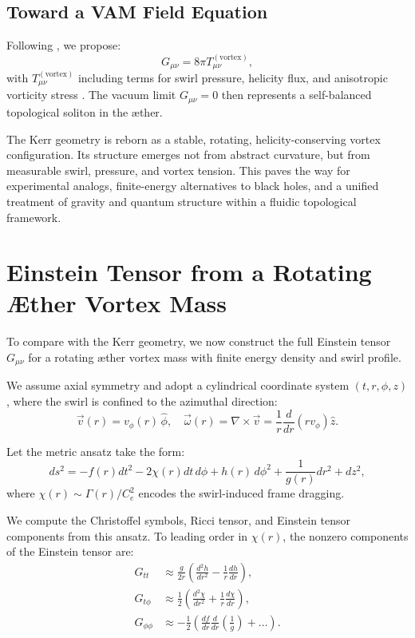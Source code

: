 \documentclass[twocolumn,aps,pre,floatfix,nofootinbib]{revtex4-2}
\begin{document}
\subsection{Toward a VAM Field Equation}
    Following \cite{Iskandarani2025c}, we propose:
    \begin{equation}
    G_{\mu\nu} = 8\pi T_{\mu\nu}^{(\text{vortex})},
    \end{equation}
    with $T_{\mu\nu}^{(\text{vortex})}$ including terms for swirl pressure, helicity flux, and anisotropic vorticity stress \cite{Iskandarani2025e}. The vacuum limit $G_{\mu\nu} = 0$ then represents a self-balanced topological soliton in the æther.

    The Kerr geometry is reborn as a stable, rotating, helicity-conserving vortex configuration. Its structure emerges not from abstract curvature, but from measurable swirl, pressure, and vortex tension. This paves the way for experimental analogs, finite-energy alternatives to black holes, and a unified treatment of gravity and quantum structure within a fluidic topological framework.





\section{Einstein Tensor from a Rotating Æther Vortex Mass}

    To compare with the Kerr geometry, we now construct the full Einstein tensor \( G_{\mu\nu} \) for a rotating æther vortex mass with finite energy density and swirl profile.

    We assume axial symmetry and adopt a cylindrical coordinate system \( (t, r, \phi, z) \), where the swirl is confined to the azimuthal direction:
    \[
        \vec{v}(r) = v_\phi(r)\, \hat{\phi}, \quad \vec{\omega}(r) = \nabla \times \vec{v} = \frac{1}{r} \frac{d}{dr} (r v_\phi) \hat{z}.
    \]

    Let the metric ansatz take the form:
    \[
        ds^2 = -f(r) dt^2 - 2\chi(r) dt\, d\phi + h(r)\, d\phi^2 + \frac{1}{g(r)} dr^2 + dz^2,
    \]
    where \( \chi(r) \sim \Gamma(r)/C_e^2 \) encodes the swirl-induced frame dragging.

    We compute the Christoffel symbols, Ricci tensor, and Einstein tensor components from this ansatz. To leading order in \( \chi(r) \), the nonzero components of the Einstein tensor are:
    \begin{align}
        G_{tt} &\approx \frac{g}{2r} \left( \frac{d^2 h}{dr^2} - \frac{1}{r} \frac{dh}{dr} \right), \\
        G_{t\phi} &\approx \frac{1}{2} \left( \frac{d^2 \chi}{dr^2} + \frac{1}{r} \frac{d\chi}{dr} \right), \\
        G_{\phi\phi} &\approx -\frac{1}{2} \left( \frac{df}{dr} \frac{d}{dr} \left( \frac{1}{g} \right) + \ldots \right).
    \end{align}
\end{document}
